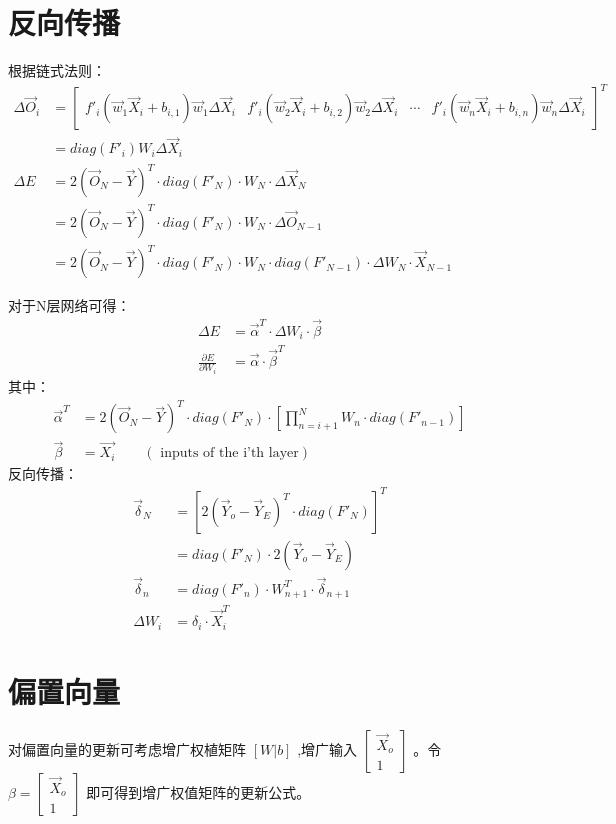 \documentclass{article}
\begin{document}
\section{反向传播}
根据链式法则：
\begin{align*}
\Delta \vec O_i&=\begin{bmatrix}
f'_i(\vec w_1 \vec X_i+b_{i,1}) \vec w_1 \Delta\vec X_i  &  f'_i(\vec w_2 \vec X_i+b_{i,2}) \vec w_2 \Delta\vec X_i & \cdots & f'_i(\vec w_n \vec X_i +b_{i,n}) \vec w_n \Delta\vec X_i
\end{bmatrix}^T \\
&=diag(F'_i)W_i \Delta\vec X_i\\
\Delta E &= 2(\vec O_N-\vec Y)^T\cdot diag(F'_N) \cdot W_N \cdot \Delta \vec X_N\\
&= 2(\vec O_N-\vec Y)^T\cdot diag(F'_N) \cdot W_N \cdot \Delta \vec O_{N-1}\\
&=2(\vec O_N-\vec Y)^T\cdot diag(F'_N) \cdot W_N \cdot diag(F'_{N-1})\cdot \Delta W_N \cdot \vec X_{N-1}
\end{align*}

对于N层网络可得：
\begin{align*}
\Delta E &= \vec{\alpha}^T\cdot\Delta W_i\cdot \vec{\beta} \\
\frac{\partial E}{\partial W_i} &= \vec{\alpha}\cdot\vec \beta^T
\end{align*}
其中：
\begin{align*}
\vec{\alpha}^T&=2(\vec O_N-\vec Y)^T\cdot diag(F'_N) \cdot \left[\prod_{n=i+1}^{N} W_n \cdot diag(F'_{n-1})\right] \\
\vec{\beta}&=\vec{X_i}\qquad (\text{ inputs of the i'th layer})
\end{align*}
反向传播：
\begin{align*}
\vec\delta_N&=[2(\vec Y_o-\vec Y_E)^T\cdot diag(F'_N)]^T \\
            &= diag(F'_N)\cdot 2(\vec Y_o-\vec Y_E) \\
\vec\delta_n&=  diag(F'_n)\cdot W_{n+1}^T \cdot\vec\delta_{n+1} \\
\Delta W_i &=\delta_i \cdot \vec X_i^T
\end{align*}


\section{偏置向量}
对偏置向量的更新可考虑增广权植矩阵 $[W|b]$ ,增广输入 $\begin{bmatrix} \vec X_o  \\ 1\end{bmatrix}$ 。令 $\beta=\begin{bmatrix} \vec X_o \\ 1\end{bmatrix}$ 即可得到增广权值矩阵的更新公式。
\end{document}
